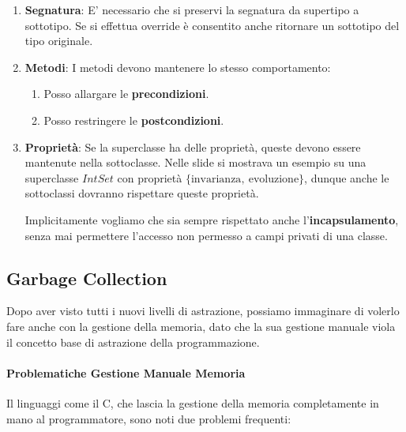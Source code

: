 \documentclass{article}
\begin{document}
\begin{enumerate}
    \item \textbf{Segnatura}: E' necessario che si preservi la segnatura da supertipo a sottotipo. Se si effettua override è consentito anche ritornare un sottotipo del tipo originale.
    \vspace*{5px}
    \item \textbf{Metodi}: I metodi devono mantenere lo stesso comportamento:
    \begin{enumerate}
        \item Posso allargare le \textbf{precondizioni}.
        \item Posso restringere le \textbf{postcondizioni}.
    \end{enumerate}
    \vspace*{5px}
    \item \textbf{Proprietà}: Se la superclasse ha delle proprietà, queste devono essere mantenute nella sottoclasse. Nelle slide si mostrava un esempio su una superclasse $IntSet$ con proprietà $\{ \text{invarianza},\: \text{evoluzione} \}$, dunque anche le sottoclassi dovranno rispettare queste proprietà.

    Implicitamente vogliamo che sia sempre rispettato anche l'\textbf{incapsulamento}, senza mai permettere l'accesso non permesso a campi privati di una classe.
\end{enumerate}

\newpage

\subsection{Garbage Collection}

Dopo aver visto tutti i nuovi livelli di astrazione, possiamo immaginare di volerlo fare anche con la gestione della memoria, dato che la sua gestione manuale viola il concetto base di astrazione della programmazione.

\vspace*{8px}

\paragraph{Problematiche Gestione Manuale Memoria} Il linguaggi come il C, che lascia la gestione della memoria completamente in mano al programmatore, sono noti due problemi frequenti:

\vspace*{8px}
\end{document}
